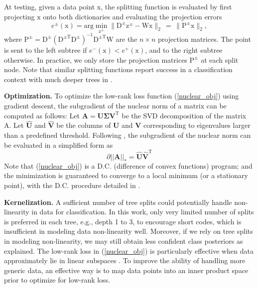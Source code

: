 \documentclass[runningheads]{llncs}
\newcommand{\bb}[1]{\boldsymbol{\mathrm{#1}}}
\newcommand{\Tr}{\mathrm{T}}
\begin{document}
At testing, given a data point $\bb{x}$, the splitting function is evaluated by first projecting $\bb{x}$ onto both dictionaries and evaluating the projection errors
\begin{equation}
e^\pm(\bb{x}) = \mathrm{arg}\min_{\bb{z}^\pm} \| \bb{D}^\pm \bb{z}^\pm - \bb{Wx} \|_2 \, =\,  \| \bb{P}^\pm \bb{x} \|_2,
\end{equation}
where $\bb{P}^\pm = \bb{D}^\pm (\bb{D}^{\pm \Tr} \bb{D}^\pm)^{-1} \bb{D}^{\pm \Tr} \bb{W}$ are the $n \times n$ projection matrices. The point is sent to the left subtree if $e^-(\bb{x}) < e^+(\bb{x})$, and to the right subtree otherwise. In practice, we only store the projection matrices $\bb{P}^\pm$ at each split node.
Note that similar splitting functions report success in a classification context with much deeper trees in \cite{qiu2013learning}.

\textbf{Optimization.}  To optimize the low-rank loss function
(\ref{nuclear_obj}) using gradient descent, the subgradient of the nuclear norm
of a matrix can be computed as follows: Let $\mathbf{A}=\mathbf{U \Sigma
  V}^\mathrm{T}$ be the SVD decomposition of the matrix A. Let
$\mathbf{\hat{U}}$ and $\mathbf{\hat{V}}$ be the columns of $\mathbf{U}$ and
$\mathbf{V}$ corresponding to eigenvalues larger than a predefined threshold.
Following \cite{lowrankT,subdifferential}, the subgradient of the nuclear norm
can be evaluated in a simplified form as
\[
\partial||\mathbf{A}||_* = \mathbf{\hat{U}} \mathbf{\hat{V}} ^\mathrm{T} 
\]
Note that (\ref{nuclear_obj}) is a D.C. (difference of convex functions)
program; and the minimization is guaranteed to converge to a local minimum (or a
stationary point), with the D.C. procedure detailed in \cite{dc2,dc1}.

\textbf{Kernelization.}  A sufficient number of tree splits could potentially
handle non-linearity in data for classification. In this work, only very limited
number of splits is preferred in each tree, e.g., depth 1 to 3, to encourage
short codes, which is insufficient in modeling data non-linearity
well. Moreover, if we rely on tree splits in modeling non-linearity, we may
still obtain less confident class posteriors as explained.  The low-rank loss in
(\ref{nuclear_obj}) is particularly effective when data approximately lie in
linear subspaces \cite{lowrankT}.  To improve the ability of handling more
generic data, an effective way is to map data points into an inner product space
prior to optimize for low-rank loss.
\end{document}

